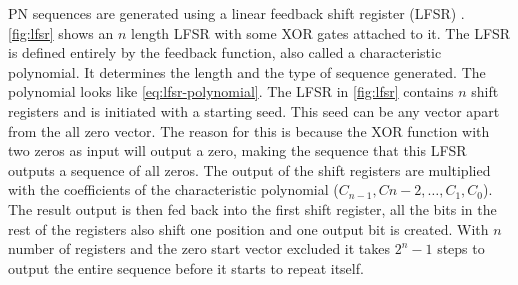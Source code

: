 		PN sequences are generated using a linear feedback shift register (LFSR) \cite{Wang:1988:LFS:52007.52024}.
		\autoref{fig:lfsr} shows an $n$ length LFSR with some XOR gates attached to it.
		The LFSR is defined entirely by the feedback function, also called a characteristic polynomial.
		It determines the length and the type of sequence generated.
		The polynomial looks like \autoref{eq:lfsr-polynomial}.
		The LFSR in \autoref{fig:lfsr} contains $n$ shift registers and is initiated with a starting seed.
		This seed can be any vector apart from the all zero vector.
		The reason for this is because the XOR function with two zeros as input will output a zero, making the sequence that this LFSR outputs a sequence of all zeros.
		The output of the shift registers are multiplied with the coefficients of the characteristic polynomial ($C_{n-1}, C{n-2}, \dotsc, C_1, C_0$).
		The result output is then fed back into the first shift register, all the bits in the rest of the registers also shift one position and one output bit is created.
		With $n$ number of registers and the zero start vector excluded it takes $2^n - 1$ steps to output the entire sequence before it starts to repeat itself.


